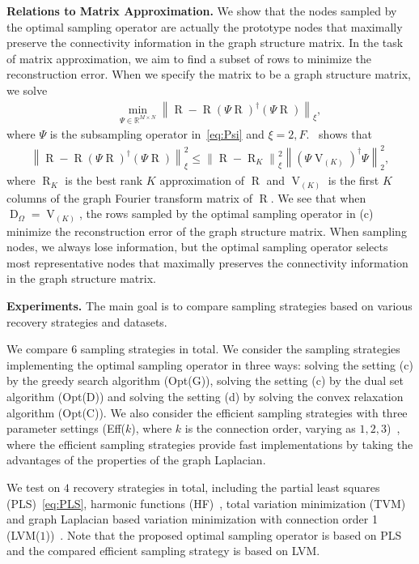 \documentclass[journal,twocolumn,10pt]{IEEEtran}
\theoremstyle{definition}
\newcommand{\mypar}[1]{{\bf #1.}}
\newcommand{\R}{\ensuremath{\mathbb{R}}}
\DeclareMathOperator{\D}{D}
\DeclareMathOperator{\RR}{R}
\DeclareMathOperator{\Vm}{V}
\begin{document}
\mypar{Relations to Matrix Approximation} 
We show that the nodes sampled by the optimal sampling operator are actually the prototype nodes that maximally preserve the connectivity information in the graph structure matrix. In the task of matrix approximation, we aim to find a subset of rows to minimize the reconstruction error. When we specify the matrix to be a graph structure matrix, we solve
\begin{eqnarray*}
 && \min_{\Psi \in \R^{M \times N} } \left\| \RR - \RR (\Psi \RR)^{\dagger} (\Psi \RR) \right\|_{\xi},
\end{eqnarray*}
where $\Psi$ is the subsampling operator in~\eqref{eq:Psi}
 and $\xi = 2, F$.~\cite{BoutsidisDM:14} shows that 
\begin{eqnarray*}
\left\| \RR - \RR (\Psi \RR)^{\dagger} (\Psi \RR)  \right\|_{\xi}^2  \leq   
\left\| \RR  - \RR_K \right\|_{\xi}^2  \left\| \left( \Psi \Vm_{(K)} \right)^{\dagger} \Psi \right\|_2^2,
\end{eqnarray*}
where $\RR_K$ is the best rank $K$ approximation of $\RR$ and $\Vm_{(K)}$ is the first $K$ columns of the graph Fourier transform matrix of $\RR$. We see that when $\D_{\Omega} = \Vm_{(K)}$, the rows sampled by the optimal sampling operator in (c) minimize the reconstruction error of the graph structure matrix. When sampling nodes, we always lose information, but the optimal sampling operator selects most representative nodes that maximally preserves the connectivity information in the graph structure matrix.



\mypar{Experiments}
The main goal is to compare sampling strategies based on various recovery strategies and datasets.

We compare $6$ sampling strategies in total. We consider the sampling strategies implementing the optimal sampling operator in three ways: solving the setting (c) by the greedy search algorithm (Opt(G)), solving the setting (c) by the dual set algorithm (Opt(D)) and solving the setting (d) by solving the convex relaxation algorithm (Opt(C)). We also consider the efficient sampling strategies with three parameter settings (Eff($k$), where $k$  is the connection order, varying as $1, 2, 3$)~\cite{AnisAO:15}, where the efficient sampling strategies provide fast implementations by taking the advantages of the properties of the graph Laplacian.

We test on $4$ recovery strategies in total, including the partial least squares (PLS)~\eqref{eq:PLS}, harmonic functions (HF)~\cite{ZhuGL:03}, total variation minimization (TVM)~\cite{ChenSMK:14} and graph Laplacian based variation minimization with connection order 1 (LVM($1$))~\cite{AnisAO:15}. Note that the proposed optimal sampling operator is based on PLS and  the compared efficient sampling strategy is based on LVM. 
\end{document}
